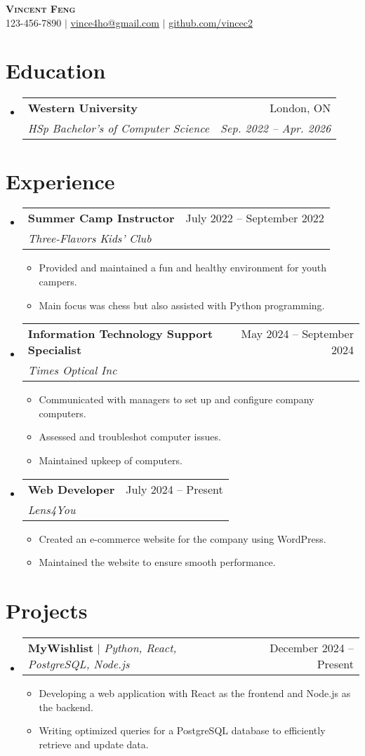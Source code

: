 \documentclass[letterpaper,11pt]{article}
\makeatletter
\newcommand{\resumeItem}[1]{
  \item\small{
    {#1 \vspace{-2pt}}
  }
}
\newcommand{\resumeSubheading}[4]{
  \vspace{-2pt}\item
    \begin{tabular*}{0.97\textwidth}[t]{l@{\extracolsep{\fill}}r}
      \textbf{#1} & #2 \\
      \textit{\small#3} & \textit{\small #4} \\
    \end{tabular*}\vspace{-7pt}
}
\newcommand{\resumeProjectHeading}[2]{
    \item
    \begin{tabular*}{0.97\textwidth}{l@{\extracolsep{\fill}}r}
      \small#1 & #2 \\
    \end{tabular*}\vspace{-7pt}
}
\newcommand{\resumeSubHeadingListStart}{\begin{itemize}[leftmargin=0.15in, label={}]}
\newcommand{\resumeSubHeadingListEnd}{\end{itemize}}
\newcommand{\resumeItemListStart}{\begin{itemize}}
\newcommand{\resumeItemListEnd}{\end{itemize}\vspace{-5pt}}
\makeatother
\begin{document}
\begin{center}
    \textbf{\Huge \scshape Vincent Feng} \\ \vspace{1pt}
    \small 123-456-7890 $|$ \href{mailto:x@x.com}{\underline{vince4ho@gmail.com}} $|$ 
    \href{https://github.com/...}{\underline{github.com/vincec2}}
\end{center}

\section{Education}
  \resumeSubHeadingListStart
    \resumeSubheading
      {Western University}{London, ON}
      {HSp Bachelor's of Computer Science}{Sep. 2022 -- Apr. 2026}
  \resumeSubHeadingListEnd

\section{Experience}
  \resumeSubHeadingListStart

    \resumeSubheading
      {Summer Camp Instructor}{July 2022 -- September 2022}
      {Three-Flavors Kids' Club}{}
      \resumeItemListStart
        \resumeItem{Provided and maintained a fun and healthy environment for youth campers.}
        \resumeItem{Main focus was chess but also assisted with Python programming.}
      \resumeItemListEnd

    \resumeSubheading
      {Information Technology Support Specialist}{May 2024 -- September 2024}
      {Times Optical Inc}{}
      \resumeItemListStart
        \resumeItem{Communicated with managers to set up and configure company computers.}
        \resumeItem{Assessed and troubleshot computer issues.}
        \resumeItem{Maintained upkeep of computers.}
    \resumeItemListEnd

    \resumeSubheading
      {Web Developer}{July 2024 -- Present}
      {Lens4You}{}
      \resumeItemListStart
        \resumeItem{Created an e-commerce website for the company using WordPress.}
        \resumeItem{Maintained the website to ensure smooth performance.}
      \resumeItemListEnd

  \resumeSubHeadingListEnd

\section{Projects}
    \resumeSubHeadingListStart
      \resumeProjectHeading
          {\textbf{MyWishlist} $|$ \emph{Python, React, PostgreSQL, Node.js}}{December 2024 -- Present}
          \resumeItemListStart
            \resumeItem{Developing a web application with React as the frontend and Node.js as the backend.}
            \resumeItem{Writing optimized queries for a PostgreSQL database to efficiently retrieve and update data.}
          \resumeItemListEnd
    \resumeSubHeadingListEnd
\end{document}
